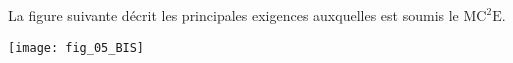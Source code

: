 \begin{multicols}{2}
La figure suivante décrit les principales exigences auxquelles est soumis le $\text{MC}^2\text{E}$.

\begin{center}
\texttt{[image: fig\_05\_BIS]}
\end{center}



\end{multicols}
